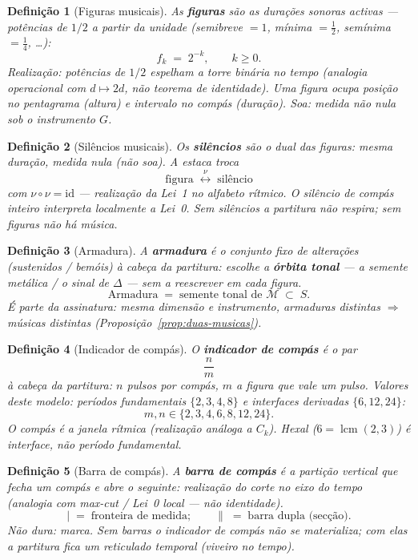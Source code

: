 \documentclass[11pt,a4paper]{article}
\newtheorem{definicao}{Definição}
\begin{document}
\begin{definicao}[Figuras musicais]\label{def:figuras}
As \textbf{figuras} são as durações sonoras activas --- potências de
$1/2$ a partir da unidade (semibreve $=1$, mínima $=\tfrac12$,
semínima $=\tfrac14$, \ldots):
\[
f_k\;=\;2^{-k},\qquad k\geq0.
\]
\emph{Realização:} potências de $1/2$ espelham a torre binária no
tempo (analogia operacional com $d\mapsto2d$, não teorema de
identidade).
Uma figura ocupa posição no pentagrama (altura) e intervalo no
compás (duração). Soa: medida não nula sob o instrumento $G$.
\end{definicao}

\begin{definicao}[Silêncios musicais]\label{def:silencios}
Os \textbf{silêncios} são o dual das figuras: mesma duração, medida
nula (não soa). A estaca troca
\[
\mathrm{figura}\;\overset{\nu}{\longleftrightarrow}\;\mathrm{silêncio}
\]
com $\nu\circ\nu=\mathrm{id}$ --- \emph{realização} da Lei~1 no
alfabeto rítmico. O silêncio de compás inteiro \emph{interpreta}
localmente a Lei~0. Sem silêncios a partitura não respira; sem figuras
não há música.
\end{definicao}

\begin{definicao}[Armadura]\label{def:armadura}
A \textbf{armadura} é o conjunto fixo de alterações (sustenidos /
bemóis) à cabeça da partitura: escolhe a \textbf{órbita tonal} --- a
semente metálica / o sinal de $\Delta$ --- sem a reescrever em cada
figura.
\[
\mathrm{Armadura}\;=\;\text{semente tonal de }\mathcal{M}
\;\subset\;S.
\]
É parte da assinatura: mesma dimensão e instrumento, armaduras
distintas $\Rightarrow$ músicas distintas (Proposição~\ref{prop:duas-musicas}).
\end{definicao}

\begin{definicao}[Indicador de compás]\label{def:compas}
O \textbf{indicador de compás} é o par
\[
\frac{n}{m}
\]
à cabeça da partitura: $n$ pulsos por compás, $m$ a figura que vale um
pulso. Valores deste modelo: períodos fundamentais $\{2,3,4,8\}$ e
interfaces derivadas $\{6,12,24\}$:
\[
m,n\in\{2,3,4,6,8,12,24\}.
\]
O compás é a janela rítmica (realização análoga a $C_k$). Hexal
($6=\operatorname{lcm}(2,3)$) é interface, não período fundamental.
\end{definicao}

\begin{definicao}[Barra de compás]\label{def:barra}
A \textbf{barra de compás} é a partição vertical que fecha um
compás e abre o seguinte: \emph{realização} do corte no eixo do tempo
(analogia com max-cut / Lei~0 local --- não identidade).
\[
|\;=\;\text{fronteira de medida};\qquad
\|\;=\;\text{barra dupla (secção)}.
\]
Não dura: marca. Sem barras o indicador de compás não se materializa;
com elas a partitura fica um reticulado temporal (viveiro no tempo).
\end{definicao}
\end{document}
